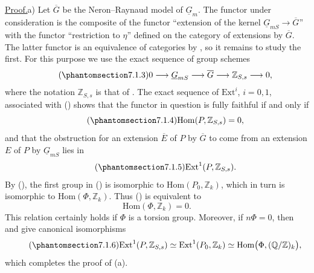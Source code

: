
\medskip
\noindent\underline{Proof.}\quad a) Let $\overline G$ be the
Neron--Raynaud model of $\underline G_m$.  The functor under consideration
is the composite of the functor ``extension of the kernel
$\underline G_{mS}\to\overline G$'' with the functor ``restriction to
$\eta$'' defined on the category of extensions by $\overline G$.  The latter
functor is an equivalence of categories by , so it remains to study the
first.  For this purpose we use the exact sequence of group schemes
\begin{equation}\tag{\SGARefTarget{sga7.sga7i.eviii.n7-1-3}{7.1.3}}
 0\longrightarrow\underline G_{mS}\longrightarrow\overline G
 \longrightarrow\mathbb Z_{S,s}\longrightarrow0,
\end{equation}
where the notation $\mathbb Z_{S,s}$ is that of .  The exact sequence of
$\mathrm{Ext}^i$, $i=0,1$, associated with () shows that the functor in
question is fully faithful if and only if
\begin{equation}\tag{\SGARefTarget{sga7.sga7i.eviii.n7-1-4}{7.1.4}}
 \mathrm{Hom}(P,\mathbb Z_{S,s})=0,
\end{equation}
and that the obstruction for an extension $\overline E$ of $P$ by
$\overline G$ to come from an extension $E$ of $P$ by
$\underline G_{mS}$ lies in
\begin{equation}\tag{\SGARefTarget{sga7.sga7i.eviii.n7-1-5}{7.1.5}}
 \mathrm{Ext}^1(P,\mathbb Z_{S,s}).
\end{equation}
By (), the first group in () is isomorphic to
$\mathrm{Hom}(P_0,\mathbb Z_k)$, which in turn is isomorphic to
$\mathrm{Hom}(\Phi,\mathbb Z_k)$.  Thus () is equivalent to
\begin{equation}\tag{7.1.4 bis}
 \mathrm{Hom}(\Phi,\mathbb Z_k)=0.
\end{equation}
This relation certainly holds if $\Phi$ is a torsion group.  Moreover, if
$n\Phi=0$, then  and  give canonical isomorphisms
\begin{equation}\tag{\SGARefTarget{sga7.sga7i.eviii.n7-1-6}{7.1.6}}
 \mathrm{Ext}^1(P,\mathbb Z_{S,s})
 \simeq\mathrm{Ext}^1(P_0,\mathbb Z_k)
 \simeq\mathrm{Hom}\bigl(\Phi,(\mathbb Q/\mathbb Z)_k\bigr),
\end{equation}
which completes the proof of (a).

